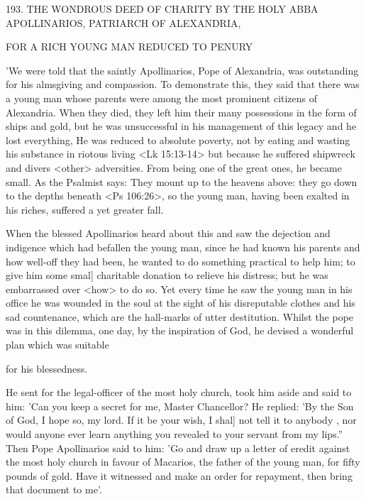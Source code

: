 193.
THE WONDROUS DEED OF CHARITY BY THE
HOLY ABBA APOLLINARIOS,
PATRIARCH OF ALEXANDRIA,

FOR A RICH YOUNG MAN REDUCED TO PENURY

'We were told that the saintly Apollinarios, Pope of Alexandria, was
outstanding for his almsgiving and compassion.
To demonstrate
this, they said that there was a young man whose parents were
among the most prominent citizens of Alexandria.
When they died,
they left him their many possessions in the form of ships and gold,
but he was unsuccessful in his management of this legacy and he
lost everything, He was reduced to absolute poverty, not by eating
and wasting his substance in riotous living <Lk 15:13-14> but
because he suffered shipwreck and divers <other> adversities.
From
being one of the great ones, he became small.
As the Psalmist says:
They mount up to the heavens above: they go down to the depths
beneath <Ps 106:26>, so the young man, having been exalted in his
riches, suffered a yet greater fall.

When the blessed Apollinarios heard about this and saw the
dejection and indigence which had befallen the young man, since he
had known his parents and how well-off they had been, he wanted
to do something practical to help him; to give him some smal]
charitable donation to relieve his distress; but he was embarrassed
over <how> to do so.
Yet every time he saw the young man in his
office he was wounded in the soul at the sight of his disreputable
clothes and his sad countenance, which are the hall-marks of utter
destitution.
Whilst the pope was in this dilemma, one day, by the
inspiration of God, he devised a wonderful plan which was suitable

for his blessedness.

He sent for the legal-officer of the most holy church, took him
aside and said to him: 'Can you keep a secret for me, Master
Chancellor? He replied: 'By the Son of God, I hope so, my lord.
If
it be your wish, I shal] not tell it to anybody , nor would anyone
ever learn anything you revealed to your servant from my lips.”
Then Pope Apollinarios said to him: 'Go and draw up a letter of
eredit against the most holy church in favour of Macarios, the
father of the young man, for fifty pounds of gold.
Have it witnessed
and make an order for repayment, then bring that document to me'.

